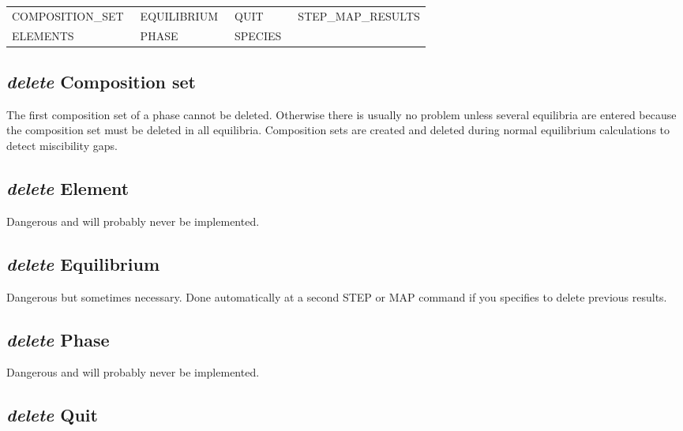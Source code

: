 \documentclass[11pt]{article}
\begin{document}
{\small
\begin{tabular}{llll}
 COMPOSITION\_SET~ & EQUILIBRIUM~ & QUIT    & STEP\_MAP\_RESULTS\\
 ELEMENTS          & PHASE        & SPECIES~\\
\end{tabular}
}

\hypertarget{Delete composition set}{}
\subsection{{\em delete} Composition set}

The first composition set of a phase cannot be deleted.  Otherwise
there is usually no problem unless several equilibria are entered
because the composition set must be deleted in all equilibria.
Composition sets are created and deleted during normal equilibrium
calculations to detect miscibility gaps.

\hypertarget{Delete element}{}
\subsection{{\em delete} Element}

Dangerous and will probably never be implemented.

\hypertarget{Delete equilibrium}{}
\subsection{{\em delete} Equilibrium}

Dangerous but sometimes necessary.  Done automatically at a second
STEP or MAP command if you specifies to delete previous results.

\hypertarget{Delete phase}{}
\subsection{{\em delete} Phase}

Dangerous and will probably never be implemented.

\hypertarget{Delete quit}{}
\subsection{{\em delete} Quit}
\end{document}
